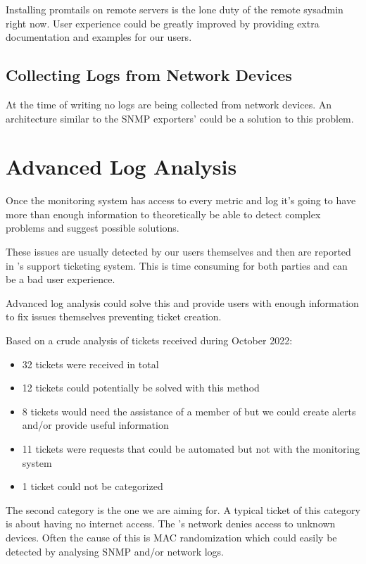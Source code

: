 Installing promtails on remote servers is the lone duty of the remote sysadmin
right now. User experience could be greatly improved by providing extra
documentation and examples for our users.

\subsection{Collecting Logs from Network Devices}

At the time of writing no logs are being collected from network devices. An
architecture similar to the SNMP exporters' could be a solution to this
problem.

\section{Advanced Log Analysis}

Once the monitoring system has access to every metric and log it's going to
have more than enough information to theoretically be able to detect complex
problems and suggest possible solutions.

These issues are usually detected by our users themselves and then are reported
in \kszk's support ticketing system. This is time consuming for both parties
and can be a bad user experience.

Advanced log analysis could solve this and provide users with enough
information to fix issues themselves preventing ticket creation.

Based on a crude analysis of tickets received during October 2022:
\begin{itemize}
	\item 32 tickets were received in total
	\item 12 tickets could potentially be solved with this method
	\item  8 tickets would need the assistance of a member of \kszk but we could create alerts and/or provide useful information
	\item 11 tickets were requests that could be automated but not with the monitoring system
	\item  1 ticket  could not be categorized
\end{itemize}

The second category is the one we are aiming for. A typical ticket of this
category is about having no internet access. The \sch's network denies access
to unknown devices. Often the cause of this is MAC randomization which could
easily be detected by analysing SNMP and/or network logs.

